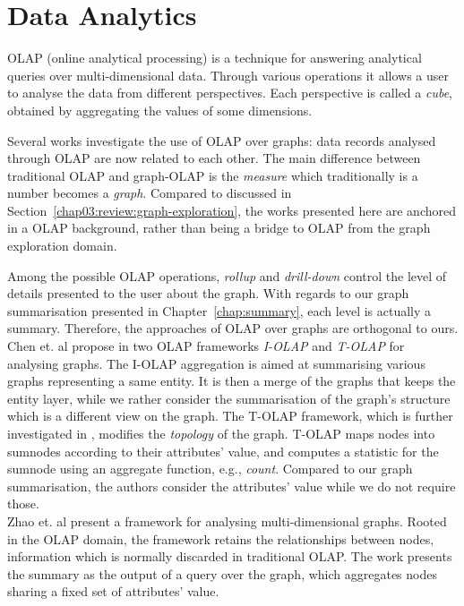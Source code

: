 \section{Data Analytics}
\label{chap03:review:data-analytics}

OLAP (online analytical processing) is a technique for answering analytical queries over multi-dimensional data. Through various operations it allows a user to analyse the data from different perspectives. Each perspective is called a \emph{cube}, obtained by aggregating the values of some dimensions.

Several works investigate the use of OLAP over graphs: data records analysed through OLAP are now related to each other. The main difference between traditional OLAP and graph-OLAP is the \emph{measure} which traditionally is a number becomes a \emph{graph}. Compared to \cite{tian:sigmod:2008} discussed in Section~\ref{chap03:review:graph-exploration}, the works presented here are anchored in a OLAP background, rather than being a bridge to OLAP from the graph exploration domain.

Among the possible OLAP operations, \emph{rollup} and \emph{drill-down} control the level of details presented to the user about the graph. With regards to our graph summarisation presented in Chapter~\ref{chap:summary}, each level is actually a summary. Therefore, the approaches of OLAP over graphs are orthogonal to ours.\\

Chen et. al propose in \cite{chen:icdm:2008} two OLAP frameworks \emph{I-OLAP} and \emph{T-OLAP} for analysing graphs. The I-OLAP aggregation is aimed at summarising various graphs representing a same entity. It is then a merge of the graphs that keeps the entity layer, while we rather consider the summarisation of the graph's structure which is a different view on the graph. The T-OLAP framework, which is further investigated in \cite{qu:dasfaa:2011}, modifies the \emph{topology} of the graph. T-OLAP maps nodes into sumnodes according to their attributes' value, and computes a statistic for the sumnode using an aggregate function, e.g., \emph{count}. Compared to our graph summarisation, the authors consider the attributes' value while we do not require those.\\

Zhao et. al \cite{zhao:sigmod:2011} present a framework for analysing multi-dimensional graphs. Rooted in the OLAP domain, the framework retains the relationships between nodes, information which is normally discarded in traditional OLAP. The work presents the summary as the output of a query over the graph, which aggregates nodes sharing a fixed set of attributes' value.

